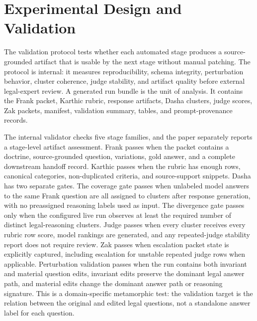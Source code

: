 \section{Experimental Design and Validation}

The validation protocol tests whether each automated stage produces a
source-grounded artifact that is usable by the next stage without manual
patching. The protocol is internal: it measures reproducibility, schema
integrity, perturbation behavior, cluster coherence, judge stability, and
artifact quality before external legal-expert review. A generated run bundle is
the unit of analysis. It contains the Frank packet, Karthic rubric, response
artifacts, Dasha clusters, judge scores, Zak packets, manifest, validation
summary, tables, and prompt-provenance records.

The internal validator checks five stage families, and the paper separately
reports a stage-level artifact assessment. Frank passes when the packet
contains a doctrine, source-grounded question, variations, gold answer, and
a complete downstream handoff record. Karthic passes when the rubric has enough rows, canonical
categories, non-duplicated criteria, and source-support snippets. Dasha has two
separate gates. The coverage gate passes when unlabeled model answers to the
same Frank question are all assigned to clusters after response generation, with
no preassigned reasoning labels used as input. The divergence gate passes only
when the configured live run observes at least the required number of distinct
legal-reasoning clusters. Judge passes when every cluster receives every rubric
row score, model rankings are generated, and any repeated-judge stability report
does not require review. Zak passes when escalation packet state is explicitly
captured, including escalation for unstable repeated judge rows when applicable.
Perturbation validation passes when the run contains both invariant and material
question edits, invariant edits preserve the dominant legal answer path, and
material edits change the dominant answer path or reasoning signature. This is a
domain-specific metamorphic test: the validation target is the relation between
the original and edited legal questions, not a standalone answer label for each
question.


